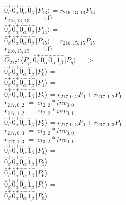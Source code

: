 \documentclass[14pt]{article}
\begin{document}
    $ \hat{0}_{\beta}^{+}\hat{0}_{\alpha}^{+}\hat{0}_{\alpha}^{-}\hat{0}_{\beta}^{-} \vert{P_{13}}\rangle = {r}_{216,13,13}P_{13} $ \\ 
    ${r}_{216,13,13}\ =\ 1.0 $ \\ 
    $ \hat{0}_{\beta}^{+}\hat{0}_{\alpha}^{+}\hat{0}_{\alpha}^{-}\hat{0}_{\beta}^{-} \vert{P_{14}}\rangle =  $ \\ 
    $ \hat{0}_{\beta}^{+}\hat{0}_{\alpha}^{+}\hat{0}_{\alpha}^{-}\hat{0}_{\beta}^{-} \vert{P_{15}}\rangle = {r}_{216,15,15}P_{15} $ \\ 
    ${r}_{216,15,15}\ =\ 1.0 $ \\ 
    
    $\hat{O}_{217}:  \langle{P_p}\vert \hat{0}_{\beta}^{+}\hat{0}_{\alpha}^{+}\hat{0}_{\alpha}^{-}\hat{1}_{\beta}^{-} \vert{P_q}\rangle => $ \\ 
    $ \hat{0}_{\beta}^{+}\hat{0}_{\alpha}^{+}\hat{0}_{\alpha}^{-}\hat{1}_{\beta}^{-} \vert{P_{0}}\rangle =  $ \\ 
    $ \hat{0}_{\beta}^{+}\hat{0}_{\alpha}^{+}\hat{0}_{\alpha}^{-}\hat{1}_{\beta}^{-} \vert{P_{1}}\rangle =  $ \\ 
    $ \hat{0}_{\beta}^{+}\hat{0}_{\alpha}^{+}\hat{0}_{\alpha}^{-}\hat{1}_{\beta}^{-} \vert{P_{2}}\rangle = {r}_{217,0,2}P_{0}+{r}_{217,1,2}P_{1} $ \\ 
    ${r}_{217,0,2}\ =\ {ci}_{2,2}*{inv}_{0,0} $ \\ 
    ${r}_{217,1,2}\ =\ {ci}_{2,2}*{inv}_{0,1} $ \\ 
    $ \hat{0}_{\beta}^{+}\hat{0}_{\alpha}^{+}\hat{0}_{\alpha}^{-}\hat{1}_{\beta}^{-} \vert{P_{3}}\rangle = {r}_{217,0,3}P_{0}+{r}_{217,1,3}P_{1} $ \\ 
    ${r}_{217,0,3}\ =\ {ci}_{3,2}*{inv}_{0,0} $ \\ 
    ${r}_{217,1,3}\ =\ {ci}_{3,2}*{inv}_{0,1} $ \\ 
    $ \hat{0}_{\beta}^{+}\hat{0}_{\alpha}^{+}\hat{0}_{\alpha}^{-}\hat{1}_{\beta}^{-} \vert{P_{4}}\rangle =  $ \\ 
    $ \hat{0}_{\beta}^{+}\hat{0}_{\alpha}^{+}\hat{0}_{\alpha}^{-}\hat{1}_{\beta}^{-} \vert{P_{5}}\rangle =  $ \\ 
    $ \hat{0}_{\beta}^{+}\hat{0}_{\alpha}^{+}\hat{0}_{\alpha}^{-}\hat{1}_{\beta}^{-} \vert{P_{6}}\rangle =  $ \\ 
    $ \hat{0}_{\beta}^{+}\hat{0}_{\alpha}^{+}\hat{0}_{\alpha}^{-}\hat{1}_{\beta}^{-} \vert{P_{7}}\rangle =  $ \\ 
    $ \hat{0}_{\beta}^{+}\hat{0}_{\alpha}^{+}\hat{0}_{\alpha}^{-}\hat{1}_{\beta}^{-} \vert{P_{8}}\rangle =  $ \\ 
\end{document}
